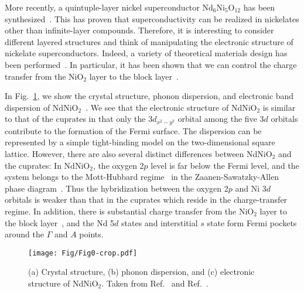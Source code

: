 \documentclass[%
 aip,
 amsmath,amssymb,
 reprint,%
]{revtex4-1}
\begin{document}
More recently, a quintuple-layer nickel superconductor Nd$_6$Ni$_5$O$_{12}$ has been synthesized~\cite{Pan_2021}.
This has proven that superconductivity can be realized in nickelates other than infinite-layer compounds. 
Therefore, it is interesting to consider different layered structures and think of manipulating the electronic structure of nickelate superconductors.
Indeed, a variety of theoretical materials design has been performed~\cite{Hirayama_2020,Kitamine_2020,Pardo_arXiv}. In particular, it has been shown that we can control the charge transfer from the NiO$_2$ layer to the block layer~\cite{Hirayama_2020}.

In Fig.~\ref{Fig1}, we show the crystal structure, phonon dispersion, and electronic band dispersion of NdNiO$_2$~\cite{Nomura_2019,Nomura_2022}. We see that the electronic structure of NdNiO$_2$ is similar to that of the cuprates in that only the 3$d_{x^2-y^2}$ orbital among the five 3$d$ orbitals contribute to the formation of the Fermi surface. The dispersion can be represented by a simple tight-binding model on the two-dimensional square lattice. However, there are also several distinct differences between NdNiO$_2$ and the cuprates: In NdNiO$_2$, the oxygen 2$p$ level is far below the Fermi level, and the system belongs to the Mott-Hubbard regime~\cite{Hepting_2020,Fu_arXiv,Goodge_2021} in the Zaanen-Sawatzky-Allen phase diagram~\cite{Zaanen_1985}. Thus the hybridization between the oxygen 2$p$ and Ni 3$d$ orbitals is weaker than that in the cuprates which reside in the charge-transfer regime. In addition, there is substantial charge transfer from the NiO$_2$ layer to the block layer~\cite{Lee_2004,Botana_2020}, and the Nd 5$d$ states and interstitial $s$ state form Fermi pockets around the $\Gamma$ and $A$ points.

\begin{figure}
\centering
\texttt{[image: Fig/Fig0-crop.pdf]}
\caption{(a) Crystal structure, (b) phonon dispersion, and (c) electronic structure of NdNiO$_2$. Taken from Ref.~ and Ref.~.}
\label{Fig1}
\end{figure}
\end{document}
